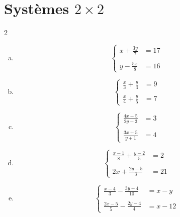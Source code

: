 \documentclass[twoside, a4paper, 12pt, openright, fullpage]{book}
\begin{document}
\section{Systèmes $2\times 2$}

\begin{exercice}\label{systeme}
\begin{multicols}{2}
\begin{enumerate}[a)] Résoudre les systèmes suivants :
    \item $$
            \left\{
            \begin{array}{ll}
               \displaystyle x+\frac{3y}{7}  &=17  \\
               \\
                \displaystyle y-\frac{5x}{8} &=16 
            \end{array}
            \right.
            $$
    \item $$
    \left\{
            \begin{array}{ll}
              \displaystyle  \frac{x}{3}+\frac{y}{4}  &=9  \\
            \\
            \displaystyle \frac{x}{4}+\frac{y}{5} &=7 
            \end{array}
            \right.
            $$
    \item $$
    \left\{
            \begin{array}{ll}
             \displaystyle   \frac{4x-5}{2y-3}  &=3  \\
             \\
             \displaystyle    \frac{3x+5}{y+1} &=4 
            \end{array}
            \right.
            $$
    \item $$
            \left\{
            \begin{array}{ll}
             \displaystyle   \frac{x-1}{8}+\frac{y-2}{5}  &=2  \\
             \\
             \displaystyle    2x+\frac{2y-5}{3} &=21 
            \end{array}
            \right.
            $$
    \item $$
            \left\{
            \begin{array}{ll}
             \displaystyle   \frac{x-4}{3} -\frac{3y+4}{10} &=x-y  \\
             \\
             \displaystyle    \frac{2x-5}{5}-\frac{2y-4}{4} &=x-12 

\end{array}$$
\end{enumerate}
\end{multicols}
\end{exercice}
\end{document}
